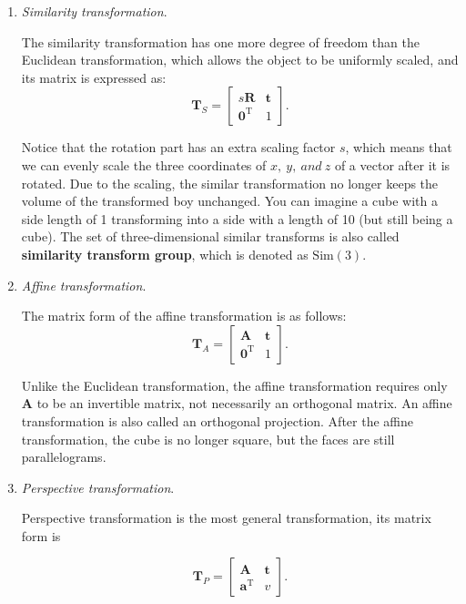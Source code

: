 \begin{enumerate}
	\item {\emph{Similarity transformation}}.
	
	The similarity transformation has one more degree of freedom than the Euclidean transformation, which allows the object to be uniformly scaled, and its matrix is ​​expressed as:
	\begin{equation}
	\mathbf{T}_S = \left[ {\begin{array}{*{20}{c}}
		{s \mathbf{R}}& \mathbf{t}\\
		{{ \mathbf{0}^\mathrm{T}}}&1
		\end{array}} \right].
	\end{equation}
	
	Notice that the rotation part has an extra scaling factor $s$, which means that we can evenly scale the three coordinates of $x,\ y,\ and\ z$ of a vector after it is rotated. Due to the scaling, the similar transformation no longer keeps the volume of ​​the transformed boy unchanged. You can imagine a cube with a side length of 1 transforming into a side with a length of 10 (but still being a cube). The set of three-dimensional similar transforms is also called \textbf{similarity transform group}, which is denoted as $\mathrm{Sim}(3)$.
	
	\item {\emph{Affine transformation}}.
	
	The matrix form of the affine transformation is as follows:
	\begin{equation}
	\mathbf{T}_A = \left[ {\begin{array}{*{20}{c}}
		\mathbf{A} & \mathbf{t}\\
		{{\mathbf{0}^\mathrm{T}}} & 1
		\end{array}} \right].
	\end{equation}
	
	Unlike the Euclidean transformation, the affine transformation requires only $\mathbf{A}$ to be an invertible matrix, not necessarily an orthogonal matrix. An affine transformation is also called an orthogonal projection. After the affine transformation, the cube is no longer square, but the faces are still parallelograms.
	
	\item{ \emph{Perspective transformation}. }
	
	Perspective transformation is the most general transformation, its matrix form is
	
	\begin{equation}
	{\mathbf{T}_P} = \left[ {\begin{array}{*{20}{c}}
		\mathbf{A} & \mathbf{t}\\
		{{\mathbf{a}^\mathrm{T}}} & v
		\end{array}} \right].
	\end{equation}
	

\end{enumerate}
